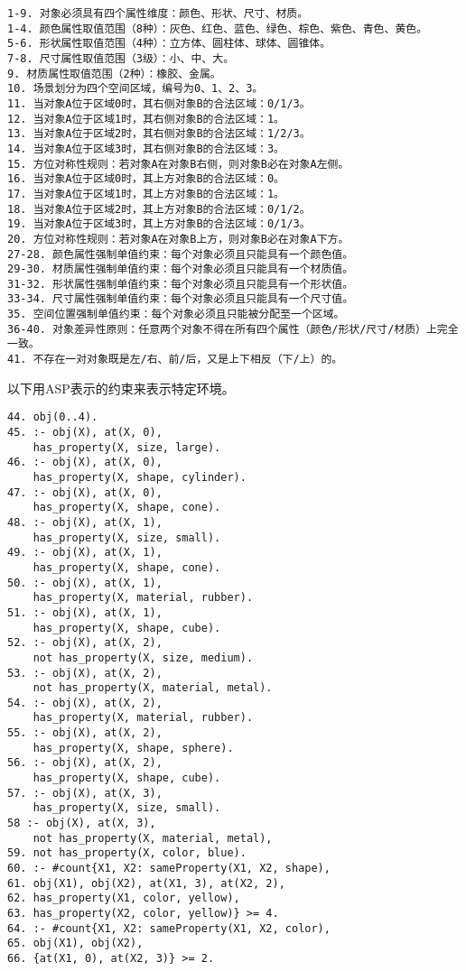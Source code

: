 \begin{lstlisting}
1-9. 对象必须具有四个属性维度：颜色、形状、尺寸、材质。
1-4. 颜色属性取值范围（8种）：灰色、红色、蓝色、绿色、棕色、紫色、青色、黄色。
5-6. 形状属性取值范围（4种）：立方体、圆柱体、球体、圆锥体。
7-8. 尺寸属性取值范围（3级）：小、中、大。
9. 材质属性取值范围（2种）：橡胶、金属。
10. 场景划分为四个空间区域，编号为0、1、2、3。
11. 当对象A位于区域0时，其右侧对象B的合法区域：0/1/3。
12. 当对象A位于区域1时，其右侧对象B的合法区域：1。
13. 当对象A位于区域2时，其右侧对象B的合法区域：1/2/3。
14. 当对象A位于区域3时，其右侧对象B的合法区域：3。
15. 方位对称性规则：若对象A在对象B右侧，则对象B必在对象A左侧。
16. 当对象A位于区域0时，其上方对象B的合法区域：0。
17. 当对象A位于区域1时，其上方对象B的合法区域：1。
18. 当对象A位于区域2时，其上方对象B的合法区域：0/1/2。
19. 当对象A位于区域3时，其上方对象B的合法区域：0/1/3。
20. 方位对称性规则：若对象A在对象B上方，则对象B必在对象A下方。
27-28. 颜色属性强制单值约束：每个对象必须且只能具有一个颜色值。
29-30. 材质属性强制单值约束：每个对象必须且只能具有一个材质值。
31-32. 形状属性强制单值约束：每个对象必须且只能具有一个形状值。
33-34. 尺寸属性强制单值约束：每个对象必须且只能具有一个尺寸值。
35. 空间位置强制单值约束：每个对象必须且只能被分配至一个区域。
36-40. 对象差异性原则：任意两个对象不得在所有四个属性（颜色/形状/尺寸/材质）上完全一致。
41. 不存在一对对象既是左/右、前/后，又是上下相反（下/上）的。
\end{lstlisting}
以下用ASP表示的约束来表示特定环境。
\begin{lstlisting}
44. obj(0..4).
45. :- obj(X), at(X, 0),
    has_property(X, size, large).
46. :- obj(X), at(X, 0),
    has_property(X, shape, cylinder).
47. :- obj(X), at(X, 0),
    has_property(X, shape, cone).
48. :- obj(X), at(X, 1),
    has_property(X, size, small).
49. :- obj(X), at(X, 1),
    has_property(X, shape, cone).
50. :- obj(X), at(X, 1),
    has_property(X, material, rubber).
51. :- obj(X), at(X, 1),
    has_property(X, shape, cube).
52. :- obj(X), at(X, 2),
    not has_property(X, size, medium).
53. :- obj(X), at(X, 2),
    not has_property(X, material, metal).
54. :- obj(X), at(X, 2),
    has_property(X, material, rubber).
55. :- obj(X), at(X, 2),
    has_property(X, shape, sphere).
56. :- obj(X), at(X, 2),
    has_property(X, shape, cube).
57. :- obj(X), at(X, 3),
    has_property(X, size, small).
58 :- obj(X), at(X, 3),
    not has_property(X, material, metal),
59. not has_property(X, color, blue).
60. :- #count{X1, X2: sameProperty(X1, X2, shape),
61. obj(X1), obj(X2), at(X1, 3), at(X2, 2),
62. has_property(X1, color, yellow),
63. has_property(X2, color, yellow)} >= 4.
64. :- #count{X1, X2: sameProperty(X1, X2, color),
65. obj(X1), obj(X2),
66. {at(X1, 0), at(X2, 3)} >= 2.
\end{lstlisting}
